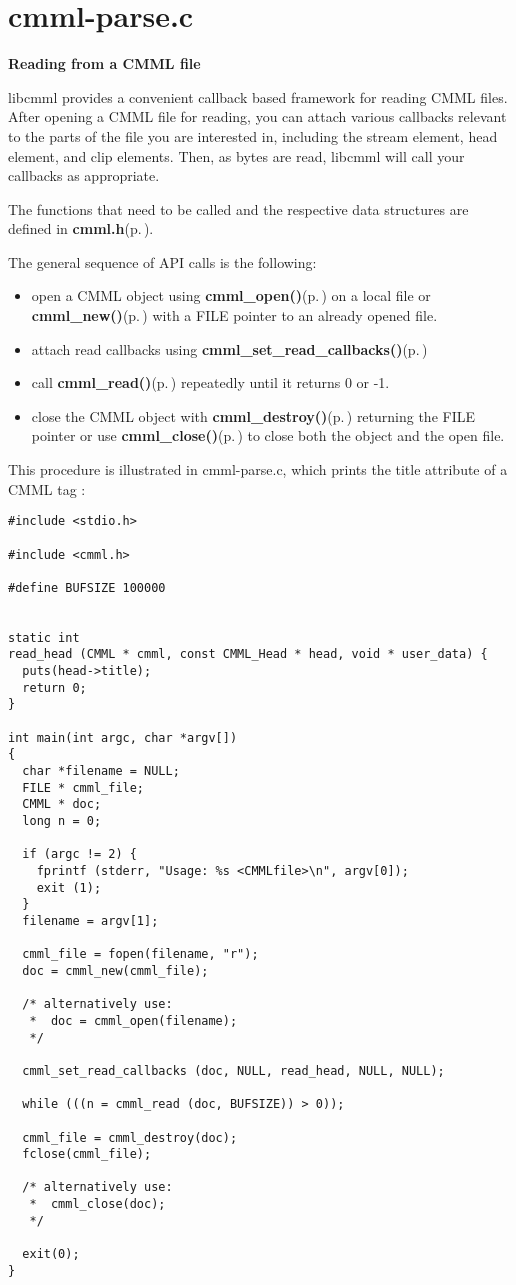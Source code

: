 \section{cmml-parse.c}
{\bf Reading from a CMML file}

libcmml provides a convenient callback based framework for reading CMML files. After opening a CMML file for reading, you can attach various callbacks relevant to the parts of the file you are interested in, including the stream element, head element, and clip elements. Then, as bytes are read, libcmml will call your callbacks as appropriate.

The functions that need to be called and the respective data structures are defined in {\bf cmml.h}{\rm (p.\,\pageref{cmml_8h})}.

The general sequence of API calls is the following:

\begin{itemize}
\item open a CMML object using {\bf cmml\_\-open()}{\rm (p.\,\pageref{cmml_8h_a37})} on a local file or {\bf cmml\_\-new()}{\rm (p.\,\pageref{cmml_8h_a38})} with a FILE pointer to an already opened file.\item attach read callbacks using {\bf cmml\_\-set\_\-read\_\-callbacks()}{\rm (p.\,\pageref{cmml_8h_a41})}\item call {\bf cmml\_\-read()}{\rm (p.\,\pageref{cmml_8h_a42})} repeatedly until it returns 0 or -1.\item close the CMML object with {\bf cmml\_\-destroy()}{\rm (p.\,\pageref{cmml_8h_a39})} returning the FILE pointer or use {\bf cmml\_\-close()}{\rm (p.\,\pageref{cmml_8h_a40})} to close both the object and the open file.\end{itemize}


This procedure is illustrated in cmml-parse.c, which prints the title attribute of a CMML tag : 

\footnotesize\begin{verbatim}
#include <stdio.h>

#include <cmml.h>

#define BUFSIZE 100000


static int
read_head (CMML * cmml, const CMML_Head * head, void * user_data) {
  puts(head->title);
  return 0;
}

int main(int argc, char *argv[])
{
  char *filename = NULL;
  FILE * cmml_file;
  CMML * doc;
  long n = 0;

  if (argc != 2) {
    fprintf (stderr, "Usage: %s <CMMLfile>\n", argv[0]);
    exit (1);
  }
  filename = argv[1];
 
  cmml_file = fopen(filename, "r");
  doc = cmml_new(cmml_file);

  /* alternatively use:
   *  doc = cmml_open(filename);
   */

  cmml_set_read_callbacks (doc, NULL, read_head, NULL, NULL);

  while (((n = cmml_read (doc, BUFSIZE)) > 0));

  cmml_file = cmml_destroy(doc);
  fclose(cmml_file);
  
  /* alternatively use:
   *  cmml_close(doc);
   */

  exit(0);
}
\end{verbatim}
\normalsize
 